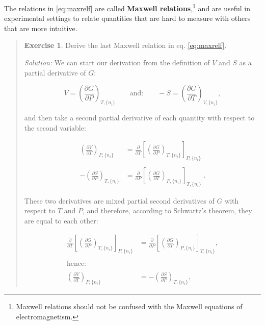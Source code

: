 \documentclass[
  9pt,
]{extbook}
\theoremstyle{definition}
\theoremstyle{definition}
\theoremstyle{definition}
\newtheorem{exercise}{Exercise}[chapter]
\theoremstyle{remark}
\begin{document}
The relations in \eqref{eq:maxrelf} are called \textbf{Maxwell relations},\footnote{Maxwell relations should not be confused with the Maxwell equations of electromagnetism.} and are useful in experimental settings to relate quantities that are hard to measure with others that are more intuitive.

\begin{quote}
\begin{exercise}
\protect\hypertarget{exr:maxwellEx}{}{\label{exr:maxwellEx} }Derive the last Maxwell relation in eq. \eqref{eq:maxrelf}.

\emph{Solution:} We can start our derivation from the definition of \(V\) and \(S\) as a partial derivative of \(G\):

\begin{equation}
 V = \left(\frac{\partial G}{\partial P} \right)_{T,\{n_i\}} \qquad \text{and:} \qquad -S = \left(\frac{\partial G}{\partial T} \right)_{V,\{n_i\}},
\end{equation}

and then take a second partial derivative of each quantity with respect to the second variable:

\begin{equation}
\begin{aligned}
 \left(\frac{\partial V}{\partial T} \right)_{P,\{n_i\}} &=\frac{\partial}{\partial T}\left[ \left(\frac{\partial G}{\partial P} \right)_{T,\{n_i\}} \right]_{P,\{n_i\}} \\
\\
-\left(\frac{\partial S}{\partial P} \right)_{T,\{n_i\}} &=\frac{\partial}{\partial P}\left[ \left(\frac{\partial G}{\partial T} \right)_{P,\{n_i\}} \right]_{T,\{n_i\}} \;.
\end{aligned}
\end{equation}

These two derivatives are mixed partial second derivatives of \(G\) with respect to \(T\) and \(P\), and therefore, according to Schwartz's theorem, they are equal to each other:

\begin{equation}
\begin{aligned}
\frac{\partial}{\partial T}\left[ \left(\frac{\partial G}{\partial P} \right)_{T,\{n_i\}} \right]_{P,\{n_i\}} &=
\frac{\partial}{\partial P}\left[ \left(\frac{\partial G}{\partial T} \right)_{P,\{n_i\}} \right]_{T,\{n_i\}}, \\
\\
\text{hence:} \\
\\
 \left(\frac{\partial V}{\partial T} \right)_{P,\{n_i\}} &= -\left(\frac{\partial S}{\partial P} \right)_{T,\{n_i\}},
\end{aligned}
\end{equation}


\end{exercise}
\end{quote}
\end{document}
